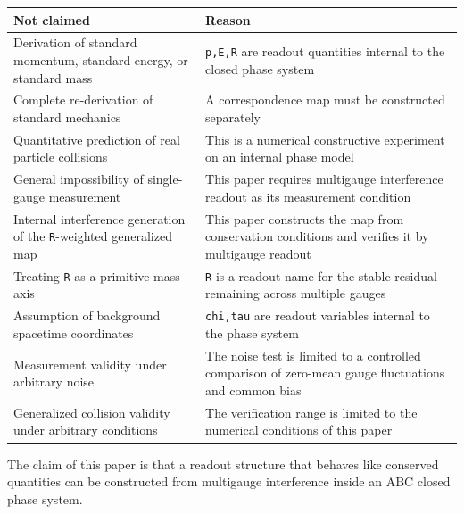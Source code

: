 \documentclass[
  a4paper,
]{article}
\newcounter{none} %
\begin{document}
{\def\LTcaptype{none} %
\begin{longtable}[]{@{}
  >{\raggedright\arraybackslash}p{}
  >{\raggedright\arraybackslash}p{}@{}}
\toprule\noalign{}
\begin{minipage}[b]{\linewidth}\raggedright
Not claimed
\end{minipage} & \begin{minipage}[b]{\linewidth}\raggedright
Reason
\end{minipage} \\
\midrule\noalign{}
\endhead
\bottomrule\noalign{}
\endlastfoot
Derivation of standard momentum, standard energy, or standard mass &
\texttt{p,E,R} are readout quantities internal to the closed phase
system \\
Complete re-derivation of standard mechanics & A correspondence map must
be constructed separately \\
Quantitative prediction of real particle collisions & This is a
numerical constructive experiment on an internal phase model \\
General impossibility of single-gauge measurement & This paper requires
multigauge interference readout as its measurement condition \\
Internal interference generation of the \texttt{R}-weighted generalized
map & This paper constructs the map from conservation conditions and
verifies it by multigauge readout \\
Treating \texttt{R} as a primitive mass axis & \texttt{R} is a readout
name for the stable residual remaining across multiple gauges \\
Assumption of background spacetime coordinates & \texttt{chi,tau} are
readout variables internal to the phase system \\
Measurement validity under arbitrary noise & The noise test is limited
to a controlled comparison of zero-mean gauge fluctuations and common
bias \\
Generalized collision validity under arbitrary conditions & The
verification range is limited to the numerical conditions of this
paper \\
\end{longtable}
}

The claim of this paper is that a readout structure that behaves like
conserved quantities can be constructed from multigauge interference
inside an ABC closed phase system.
\end{document}
